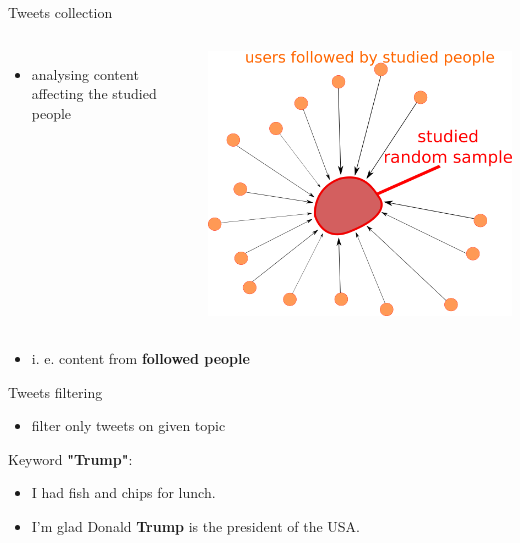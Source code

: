 \documentclass{beamer}
\newcommand{\cmark}{\ding{51}} %
\newcommand{\xmark}{\ding{55}} %
\begin{document}
\begin{frame}[fragile]
\begin{columns}[T]
\begin{column}{.33\textwidth}
\begin{block}{Tweets collection}
\begin{columns}
\begin{itemize}
            \item analysing content affecting the studied people
    	\end{itemize}
    	\center
    	\includegraphics[scale=0.65]{./Pics/followers.png}
    \end{columns}
    \vspace{0.8cm}
    \begin{itemize}
        \item i. e. content from \textbf{followed people}
    \end{itemize}
\end{block}
\begin{block}{Tweets filtering}
\begin{itemize}
    \item filter only tweets on given topic
\end{itemize}
\vspace{0.3cm}
Keyword \textbf{"Trump"}:
\vspace{0.7cm}
\begin{itemize}\centering
    \item[\textcolor{black}{\xmark}] I had fish and chips for lunch.
    \item[\textcolor{black}{\cmark}] I'm glad Donald \textbf{Trump} is the president of the USA.

\end{itemize}
\end{block}
\end{column}
\end{columns}
\end{frame}
\end{document}
